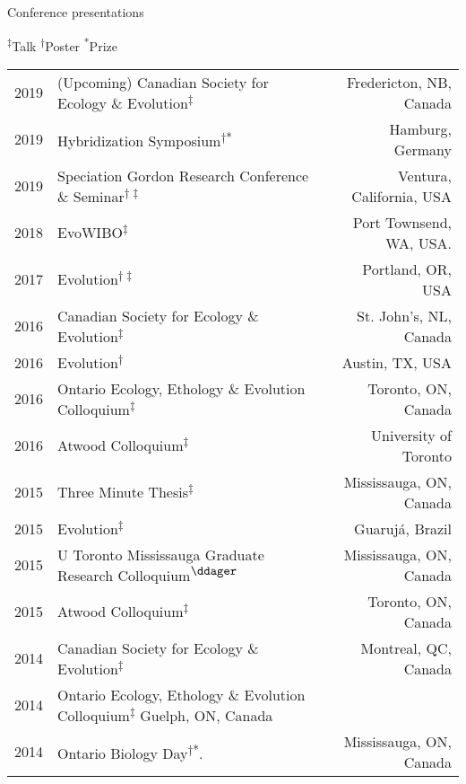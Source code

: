 \documentclass[12pt]{article}
\begin{document}
\noindent
\begin{rSection}{Conference presentations} %


\textsuperscript{$\ddagger$}Talk
\textsuperscript{$\dag$}Poster
\textsuperscript{*}Prize



\vspace{0.5em}


\begin{tabular}{llr}

2019 & (Upcoming) Canadian Society for Ecology \& Evolution\textsuperscript{$\ddagger$} & Fredericton, NB, Canada\\
2019 & Hybridization Symposium\textsuperscript{$\dag$*} & Hamburg, Germany\\
2019 & Speciation Gordon Research Conference \& Seminar\textsuperscript{$\dag\ddagger$} & Ventura, California, USA\\
2018 & EvoWIBO\textsuperscript{$\ddagger$} & Port Townsend, WA, USA.\\
2017 & Evolution\textsuperscript{$\dag\ddagger$} & Portland, OR, USA\\
2016 & Canadian Society for Ecology \& Evolution\textsuperscript{$\ddagger$} & St. John’s, NL, Canada\\
2016 & Evolution\textsuperscript{$\dag$} & Austin, TX, USA\\
2016 & Ontario Ecology, Ethology \& Evolution Colloquium\textsuperscript{$\ddagger$} & Toronto, ON, Canada\\
2016 & Atwood Colloquium\textsuperscript{$\ddagger$} & University of Toronto\\
2015 & Three Minute Thesis\textsuperscript{$\ddagger$} & Mississauga, ON, Canada\\
2015 & Evolution\textsuperscript{$\ddagger$} & Guaruj\'a, Brazil\\
2015 & U Toronto Mississauga Graduate Research Colloquium\textsuperscript{$\ddager$} & Mississauga, ON, Canada\\
2015 & Atwood Colloquium\textsuperscript{$\ddagger$} & Toronto, ON, Canada\\
2014 & Canadian Society for Ecology \& Evolution\textsuperscript{$\ddagger$} & Montreal, QC, Canada\\
2014 & Ontario Ecology, Ethology \& Evolution Colloquium\textsuperscript{$\ddagger$} Guelph, ON, Canada\\
2014 & Ontario Biology Day\textsuperscript{$\dagger$*}. & Mississauga, ON, Canada\\
\end{tabular}

\end{rSection}
\vspace{0.5em}
\end{document}

